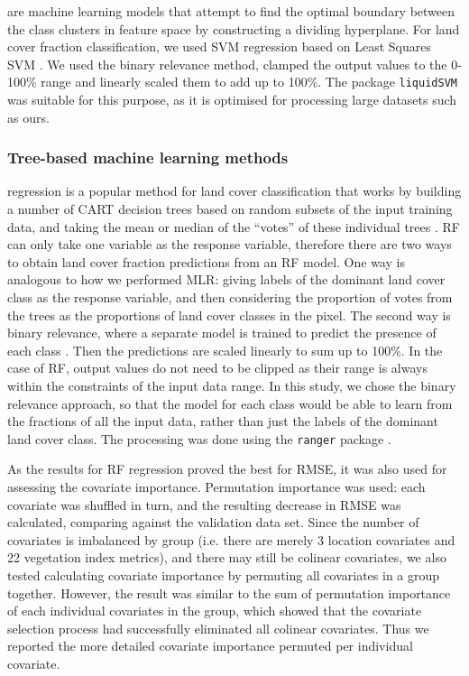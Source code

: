 \documentclass[review,authoryear,3p]{elsarticle}
\begin{document}
 are machine learning models that attempt to find the optimal boundary between the class clusters in feature space by constructing a dividing hyperplane.
For land cover fraction classification, we used \gls{SVM} regression based on Least Squares \gls{SVM} \citep{suykens_least_1999}.
We used the binary relevance method, clamped the output values to the 0-100\% range and linearly scaled them to add up to 100\%.
The package \texttt{liquidSVM} \citep{liquidSVM} was suitable for this purpose, as it is optimised for processing large datasets such as ours.

\subsubsection{Tree-based machine learning methods}

 regression is a popular method for land cover classification that works by building a number of \gls{CART} decision trees based on random subsets of the input training data, and taking the mean or median of the ``votes'' of these individual trees \citep{breiman2001random}.
\ac{RF} can only take one variable as the response variable, therefore there are two ways to obtain land cover fraction predictions from an \ac{RF} model.
One way is analogous to how we performed \ac{MLR}: giving labels of the dominant land cover class as the response variable, and then considering the proportion of votes from the trees as the proportions of land cover classes in the pixel.
The second way is binary relevance, where a separate model is trained to predict the presence of each class \citet{karalas2016br}.
Then the predictions are scaled linearly to sum up to 100\%.
In the case of \gls{RF}, output values do not need to be clipped as their range is always within the constraints of the input data range.
In this study, we chose the binary relevance approach, so that the model for each class would be able to learn from the fractions of all the input data, rather than just the labels of the dominant land cover class.
The processing was done using the \texttt{ranger} package \citep{ranger}.

As the results for \gls{RF} regression proved the best for \gls{RMSE}, it was also used for assessing the covariate importance.
Permutation importance was used: each covariate was shuffled in turn, and the resulting decrease in \gls{RMSE} was calculated, comparing against the validation data set.
Since the number of covariates is imbalanced by group (i.e. there are merely 3 location covariates and 22 vegetation index metrics), and there may still be colinear covariates, we also tested calculating covariate importance by permuting all covariates in a group together.
However, the result was similar to the sum of permutation importance of each individual covariates in the group, which showed that the covariate selection process had successfully eliminated all colinear covariates.
Thus we reported the more detailed covariate importance permuted per individual covariate.
\end{document}

